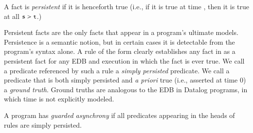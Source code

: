 \begin{definition}

A fact is {\em persistent} if it is henceforth true 
(i.e., if it is true at time , then it is true at all $\dedalus{s} > \dedalus{t}$.)
\end{definition}

Persistent facts are the only facts that appear in a program's ultimate models.
Persistence is a semantic notion, but in certain cases it is detectable from the program's 
syntax alone.  A rule of the form  clearly establishes any fact
in  as a persistent fact for any EDB and execution in which the fact
is ever true. 
We call a predicate referenced by such a rule
a {\em simply persisted} predicate.  
We call a predicate that is both simply persisted and  {\em a priori} true (i.e., asserted
at time 0) a {\em ground truth}.  Ground truths are analogous to the EDB in Datalog programs,
in which time is not explicitly modeled.  


\begin{definition}
A \lang program has {\em guarded asynchrony} if all predicates 
appearing in the heads of  rules
are simply persisted.
\end{definition}



